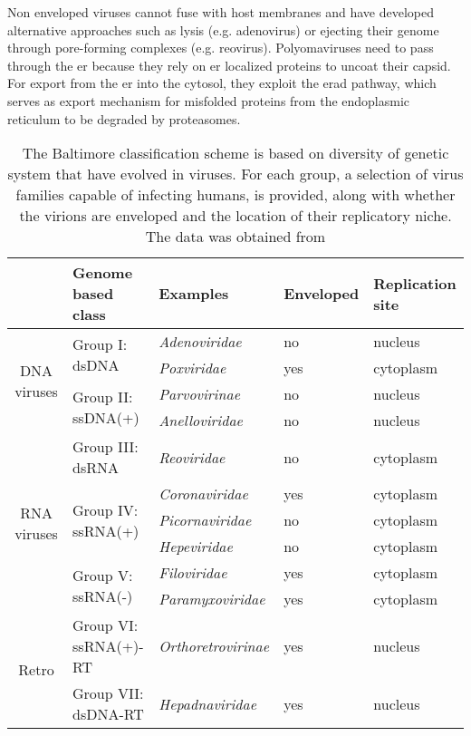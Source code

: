 Non enveloped viruses cannot fuse with host membranes and have developed alternative approaches such as lysis (e.g. adenovirus) or ejecting their genome through pore-forming complexes (e.g. reovirus). Polyomaviruses need to pass through the \gls{er} because they rely on \gls{er} localized proteins to uncoat their capsid. For export from the \gls{er} into the cytosol, they exploit the \gls{erad} pathway, which serves as export mechanism for misfolded proteins from the endoplasmic reticulum to be degraded by proteasomes.

\renewcommand{\arraystretch}{1.5}

\begin{table}
  \centering
  \caption[The Baltimore classification scheme for viruses]{The Baltimore classification scheme is based on diversity of genetic system that have evolved in viruses. For each group, a selection of virus families capable of infecting humans, is provided, along with whether the virions are enveloped and the location of their replicatory niche. The data was obtained from \cite{Hulo2011}}
  \label{tab:baltimore-classification}
  \footnotesize
  \begin{tabular}{c|llll}
    & Genome based class & Examples & Enveloped & Replication site \\
    \hline \multirow{4}{*}{\begin{sideways}DNA viruses\end{sideways}} &
    \multirow{2}{*}{Group I: dsDNA} &
    \textit{Adenoviridae} &
    no & nucleus \\
    &
    & \textit{Poxviridae} &
    yes & cytoplasm \\
    \cline{2-5} &
    \multirow{2}{*}{Group II: ssDNA(+)} &
    \textit{Parvovirinae} &
    no & nucleus \\
    &
    & \textit{Anelloviridae} &
    no & nucleus \\
    \hline \multirow{6}{*}{\begin{sideways}RNA viruses\end{sideways}} &   
    Group III: dsRNA &
    \textit{Reoviridae} &
    no & cytoplasm \\
    \cline{2-5} &
    \multirow{3}{*}{Group IV: ssRNA(+)} &
    \textit{Coronaviridae} &
    yes & cytoplasm \\
    &
    & \textit{Picornaviridae} &
    no & cytoplasm \\
    &
    & \textit{Hepeviridae} &
    no & cytoplasm \\
    \cline{2-5} &
    \multirow{2}{*}{Group V: ssRNA(-)} &
    \textit{Filoviridae} &
    yes & cytoplasm \\
    &
    & \textit{Paramyxoviridae} &
    yes & cytoplasm \\
    \hline \multirow{2}{*}{\begin{sideways}Retro\end{sideways}} &   
    Group VI: ssRNA(+)-RT &
    \textit{Orthoretrovirinae} &
    yes & nucleus \\
    \cline{2-5} &
    Group VII: dsDNA-RT &
    \textit{Hepadnaviridae} &
    yes & nucleus
  \end{tabular}
\end{table}

